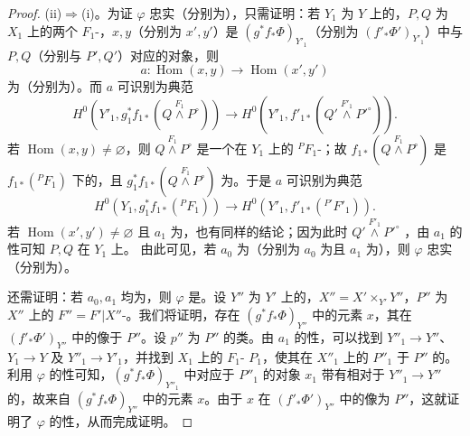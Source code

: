 \begin{proof}
(ii)$\Rightarrow$(i)。为证 $\varphi$ 忠实（分别为），只需证明：若 $Y_1$ 为 $Y$ 上的，$P,Q$ 为 $X_1$ 上的两个 $F_1$-，$x,y$（分别为 $x',y'$）是 $(g^*f_*\Phi)_{Y'_1}$（分别为 $(f'_*\Phi')_{Y'_1}$）中与 $P,Q$（分别与 $P',Q'$）对应的对象，则
\[a:\operatorname{Hom}(x,y)\longrightarrow\operatorname{Hom}(x',y')\]
为（分别为）。而 $a$ 可识别为典范
\[
H^0(Y'_1,g_1^*f_{1*}(Q\overset{F_1}{\wedge}P^\circ))\longrightarrow
H^0(Y'_1,f'_{1*}(Q'\overset{F'_1}{\wedge}P'^\circ)).
\]
若 $\operatorname{Hom}(x,y)\ne\varnothing$，则 $Q\overset{F_1}{\wedge}P^\circ$ 是一个在 $Y_1$ 上的 ${}^PF_1$-；故 $f_{1*}(Q\overset{F_1}{\wedge}P^\circ)$ 是 $f_{1*}({}^PF_1)$ 下的，且 $g_1^*f_{1*}(Q\overset{F_1}{\wedge}P^\circ)$ 为。于是 $a$ 可识别为典范
\[H^0(Y_1,g_1^*f_{1*}({}^PF_1))\longrightarrow H^0(Y'_1,f'_{1*}({}^{P'}F'_1)).\]
若 $\operatorname{Hom}(x',y')\ne\varnothing$ 且 $a_1$ 为，也有同样的结论；因为此时 $Q'\overset{F'_1}{\wedge}P'^\circ$ ，由 $a_1$ 的性可知 $P,Q$ 在 $Y_1$ 上。
由此可见，若 $a_0$ 为（分别为 $a_0$ 为且 $a_1$ 为），则 $\varphi$ 忠实（分别为）。

还需证明：若 $a_0,a_1$ 均为，则 $\varphi$ 是。设 $Y''$ 为 $Y'$ 上的，$X''=X'\times_{Y'}Y''$，$P''$ 为 $X''$ 上的 $F''=F'|X''$-。我们将证明，存在 $(g^*f_*\Phi)_{Y''}$ 中的元素 $x$，其在 $(f'_*\Phi')_{Y''}$ 中的像于 $P''$。设 $p''$ 为 $P''$ 的类。由 $a_1$ 的性，可以找到 $Y''_1\to Y''$、 $Y_1\to Y$ 及 $Y''_1\to Y'_1$，并找到 $X_1$ 上的 $F_1$- $P_1$，使其在 $X''_1$ 上的 $P''_1$ 于 $P''$ 的。利用 $\varphi$ 的性可知，$(g^*f_*\Phi)_{Y''_1}$ 中对应于 $P''_1$ 的对象 $x_1$ 带有相对于 $Y''_1\to Y''$ 的，故来自 $(g^*f_*\Phi)_{Y''}$ 中的元素 $x$。由于 $x$ 在 $(f'_*\Phi')_{Y''}$ 中的像为 $P''$，这就证明了 $\varphi$ 的性，从而完成证明。
\end{proof}

